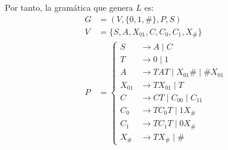 \begin{ejercicio}
    Por tanto, la gramática que genera $L$ es:
    \begin{equation*}
        \begin{aligned}
            G &= (V,\{0,1,\#\},P,S) \\
            V &= \{ S, A, X_{01}, C, C_0, C_1, X_{\#} \} \\
            P &= \left\{
                \begin{aligned}
                    S &\to A \mid C\\
                    T &\to 0\mid 1\\
                    A &\to TAT \mid X_{01}\# \mid \#X_{01}\\
                    X_{01} &\to TX_{01}\mid T\\
                    C &\to CT \mid C_00 \mid C_11\\
                    C_0 &\to TC_0T \mid 1X_{\#}\\
                    C_1 &\to TC_1T \mid 0X_{\#}\\
                    X_{\#} &\to T X_{\#} \mid \#
                \end{aligned}
            \right.
        \end{aligned}
    \end{equation*}
\end{ejercicio}

